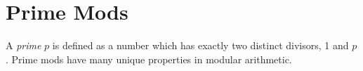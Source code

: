 \documentclass[11pt]{article}
\theoremstyle{definition}
\newcommand{\fdbox}[2]{\fbox{\sffamily\LARGE\vphantom y#1: \bfseries #2} \par\vspace{1em}} %
\begin{document}
\newcommand{\logo}{%
\begin{minipage}[b]{22em}
\centering\noindent
\\[0.5em]
\begin{minipage}[t][4em][t]{12em} \centering
{\huge \bfseries ${\bf 26^{\text{th}}}$ TJIMO } \\
\textsc{\large Alexandria, Virginia}
\end{minipage}
\end{minipage}
\vspace*{-0.05em}
}
\newcommand{\sevenpoints}{Time limit: 45 minutes.}
\newcommand{\righthead}{\fdbox{Round}{Power}}


\section{Prime Mods}
A \textit{prime} $p$ is defined as a number which has exactly two distinct divisors, 1 and $p$. Prime mods have many unique properties in modular arithmetic.
\end{document}
